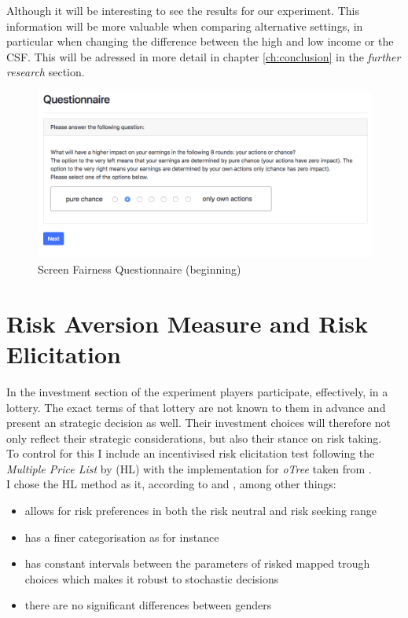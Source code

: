     Although it will be interesting to see the results for our experiment. This information will be more valuable when comparing alternative settings, in particular when changing the difference between the high and low income or the CSF. This will be adressed in more detail in chapter \ref{ch:conclusion} in the \textit{further research} section.
    
    
    \begin{figure}
        \centering
        \includegraphics[width=\textwidth]{graphs/Fairness_Q_Begin.png}
        \caption{Screen Fairness Questionnaire (beginning)}
        \label{fig:fair_q}
    \end{figure}
    
        
    \section{Risk Aversion Measure and Risk Elicitation}
    
    In the investment section of the experiment players participate, effectively, in a lottery. The exact terms of that lottery are not known to them in advance and present an strategic decision as well. Their investment choices will therefore not only reflect their strategic considerations, but also their stance on risk taking.\\
    
    To control for this I include an incentivised risk elicitation test following the \textit{Multiple Price List} by \cite{holt2002} (HL) with the implementation for \textit{oTree} taken from \cite{holzmeister2017}.\\
    
    I chose the HL method as it, according to \cite{crosetto2016} and \cite{harrison2008}, among other things:
    \begin{itemize}
        \item allows for risk preferences in both the risk neutral and risk seeking range
        \item has a finer categorisation as for instance \cite{eckel2008}
        \item has constant intervals between the parameters of risked mapped trough choices which makes it robust to stochastic decisions
        \item there are no significant differences between genders
    \end{itemize}  
       
